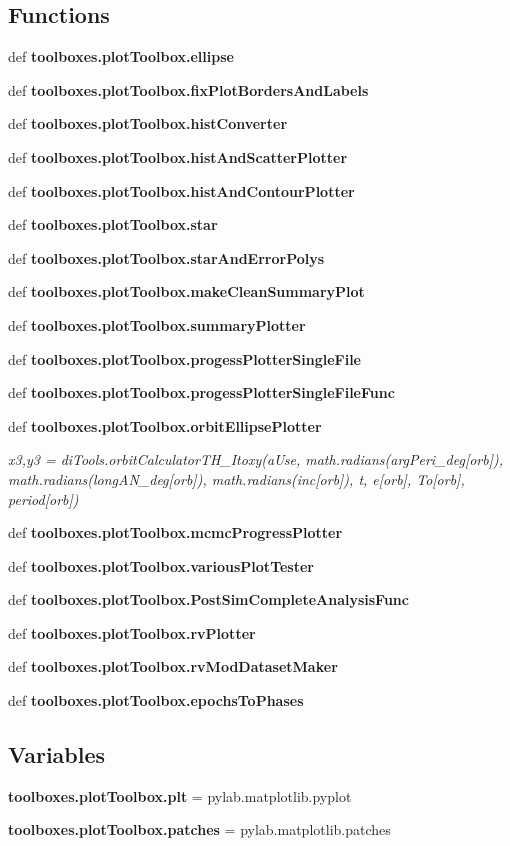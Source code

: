 \subsection*{Functions}
\begin{DoxyCompactItemize}
\item 
def {\bf toolboxes.\-plot\-Toolbox.\-ellipse}
\item 
def {\bf toolboxes.\-plot\-Toolbox.\-fix\-Plot\-Borders\-And\-Labels}
\item 
def {\bf toolboxes.\-plot\-Toolbox.\-hist\-Converter}
\item 
def {\bf toolboxes.\-plot\-Toolbox.\-hist\-And\-Scatter\-Plotter}
\item 
def {\bf toolboxes.\-plot\-Toolbox.\-hist\-And\-Contour\-Plotter}
\item 
def {\bf toolboxes.\-plot\-Toolbox.\-star}
\item 
def {\bf toolboxes.\-plot\-Toolbox.\-star\-And\-Error\-Polys}
\item 
def {\bf toolboxes.\-plot\-Toolbox.\-make\-Clean\-Summary\-Plot}
\item 
def {\bf toolboxes.\-plot\-Toolbox.\-summary\-Plotter}
\item 
def {\bf toolboxes.\-plot\-Toolbox.\-progess\-Plotter\-Single\-File}
\item 
def {\bf toolboxes.\-plot\-Toolbox.\-progess\-Plotter\-Single\-File\-Func}
\item 
def {\bf toolboxes.\-plot\-Toolbox.\-orbit\-Ellipse\-Plotter}
\begin{DoxyCompactList}\small\item\em x3,y3 = di\-Tools.\-orbit\-Calculator\-T\-H\-\_\-\-Itoxy(a\-Use, math.\-radians(arg\-Peri\-\_\-deg[orb]), math.\-radians(long\-A\-N\-\_\-deg[orb]), math.\-radians(inc[orb]), t, e[orb], To[orb], period[orb]) \end{DoxyCompactList}\item 
def {\bf toolboxes.\-plot\-Toolbox.\-mcmc\-Progress\-Plotter}
\item 
def {\bf toolboxes.\-plot\-Toolbox.\-various\-Plot\-Tester}
\item 
def {\bf toolboxes.\-plot\-Toolbox.\-Post\-Sim\-Complete\-Analysis\-Func}
\item 
def {\bf toolboxes.\-plot\-Toolbox.\-rv\-Plotter}
\item 
def {\bf toolboxes.\-plot\-Toolbox.\-rv\-Mod\-Dataset\-Maker}
\item 
def {\bf toolboxes.\-plot\-Toolbox.\-epochs\-To\-Phases}
\end{DoxyCompactItemize}
\subsection*{Variables}
\begin{DoxyCompactItemize}
\item 
{\bf toolboxes.\-plot\-Toolbox.\-plt} = pylab.\-matplotlib.\-pyplot
\item 
{\bf toolboxes.\-plot\-Toolbox.\-patches} = pylab.\-matplotlib.\-patches
\end{DoxyCompactItemize}
